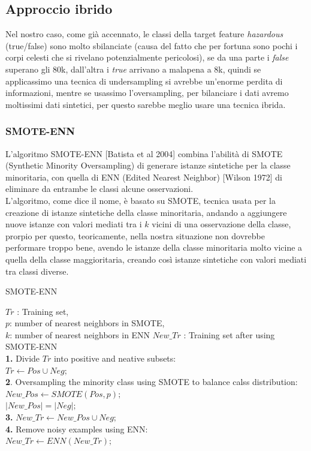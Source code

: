 \documentclass[italian,12pt,a4paper]{article}
\begin{document}
	\subsection{Approccio ibrido}
	Nel nostro caso, come già accennato, le classi della target feature \textit{hazardous} (true/false) sono molto sbilanciate (causa del fatto che per fortuna sono pochi i corpi celesti che si rivelano potenzialmente pericolosi), se da una parte i \textit{false} superano gli 80k, dall'altra i \textit{true} arrivano a malapena a 8k, quindi se applicassimo una tecnica di undersampling si avrebbe un’enorme perdita di informazioni, mentre se usassimo l’oversampling, per bilanciare i dati avremo moltissimi dati sintetici, per questo sarebbe meglio usare una tecnica ibrida.
	\linebreak
	\subsubsection{SMOTE-ENN}
	L’algoritmo SMOTE-ENN [Batista et al 2004] combina l’abilità di SMOTE (Synthetic Minority Oversampling)  di generare istanze sintetiche per la classe minoritaria, con quella di ENN (Edited Nearest Neighbor) [Wilson 1972] di eliminare da entrambe le classi alcune osservazioni. \\
	\linebreak
	L'algoritmo, come dice il nome, è basato su SMOTE, tecnica usata per la creazione di istanze sintetiche della classe minoritaria, andando a aggiungere nuove istanze con valori mediati tra i $k$ vicini di una osservazione della classe, prorpio per questo, teoricamente, nella nostra situazione non dovrebbe performare troppo bene, avendo le istanze della classe minoritaria molto vicine a quella della classe maggioritaria, creando così istanze sintetiche con valori mediati tra classi diverse.
	
	\begin{algorithm}
		\caption{SMOTE-ENN}
		\begin{algorithmic}
			\Require $Tr$ : Training set, \\ $p$: number of nearest neighbors in SMOTE, \\ $k$: number of nearest neighbors in ENN
			\Ensure $New\_Tr$ : Training set after using SMOTE-ENN \\
			\textbf{1.} Divide $Tr$ into positive and neative subsets: \\ $Tr \leftarrow Pos \cup Neg;$  \\
			\textbf{2}. Oversampling the minority class using SMOTE to balance calss distribution: \\
			$New\_Pos \leftarrow SMOTE(Pos, p);$ \\
			$|New\_Pos| = |Neg|;$ \\
			\textbf{3.} $New\_Tr \leftarrow New\_Pos \cup Neg;$ \\
			\textbf{4.} Remove noisy examples using ENN: \\
			$New\_Tr \leftarrow ENN(New\_Tr);$
		\end{algorithmic}
	\end{algorithm}
\end{document}
